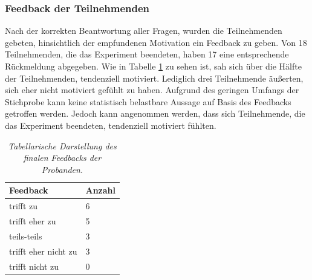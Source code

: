 \subsubsection{Feedback der Teilnehmenden}
Nach der korrekten Beantwortung aller Fragen, wurden die Teilnehmenden gebeten, hinsichtlich der empfundenen Motivation ein Feedback zu geben. Von 18 Teilnehmenden, die das Experiment beendeten, haben 17 eine entsprechende Rückmeldung abgegeben. Wie in Tabelle \ref{feedback} zu sehen ist, sah sich über die Hälfte der Teilnehmenden, tendenziell motiviert. Lediglich drei Teilnehmende äußerten, sich eher nicht motiviert gefühlt zu haben. Aufgrund des geringen Umfangs der Stichprobe kann keine statistisch belastbare Aussage auf Basis des Feedbacks getroffen werden. Jedoch kann angenommen werden, dass sich Teilnehmende, die das Experiment beendeten, tendenziell motiviert fühlten.

\begin{table}[htbp]
\centering
\caption{\textit{Tabellarische Darstellung des finalen Feedbacks der Probanden.}}
\begin{tabular}{ p{4cm}   p{2cm}}
 \hline
 Feedback & Anzahl \\
 \hline
 trifft zu & 6 \\
 trifft eher zu & 5 \\
 teils-teils & 3 \\
 trifft eher nicht zu & 3 \\
 trifft nicht zu & 0 \\
 \hline
\end{tabular}
\label{feedback}
\end{table}